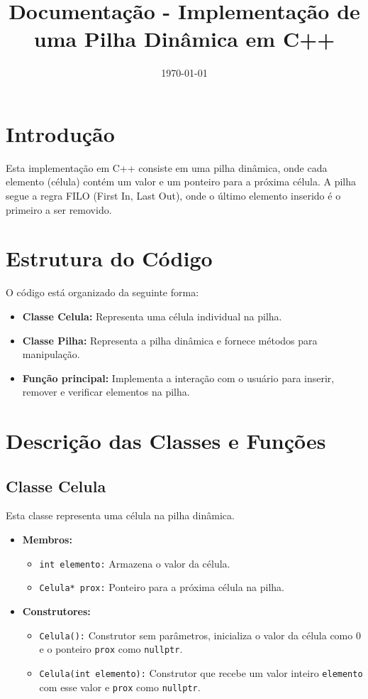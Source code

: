 \documentclass[a4paper,12pt]{article}
\title{Documentação - Implementação de uma Pilha Dinâmica em C++}
\date{\today}
\begin{document}
\maketitle

\section{Introdução}
Esta implementação em C++ consiste em uma pilha dinâmica, onde cada elemento (célula) contém um valor e um ponteiro para a próxima célula. A pilha segue a regra FILO (First In, Last Out), onde o último elemento inserido é o primeiro a ser removido.

\section{Estrutura do Código}
O código está organizado da seguinte forma:
\begin{itemize}
    \item \textbf{Classe Celula:} Representa uma célula individual na pilha.
    \item \textbf{Classe Pilha:} Representa a pilha dinâmica e fornece métodos para manipulação.
    \item \textbf{Função principal:} Implementa a interação com o usuário para inserir, remover e verificar elementos na pilha.
\end{itemize}

\section{Descrição das Classes e Funções}

\subsection{Classe Celula}
Esta classe representa uma célula na pilha dinâmica.
\begin{itemize}
    \item \textbf{Membros:}
    \begin{itemize}
        \item \texttt{int elemento:} Armazena o valor da célula.
        \item \texttt{Celula* prox:} Ponteiro para a próxima célula na pilha.
    \end{itemize}
    \item \textbf{Construtores:}
    \begin{itemize}
        \item \texttt{Celula():} Construtor sem parâmetros, inicializa o valor da célula como 0 e o ponteiro \texttt{prox} como \texttt{nullptr}.
        \item \texttt{Celula(int elemento):} Construtor que recebe um valor inteiro  \texttt{elemento} com esse valor e \texttt{prox} como \texttt{nullptr}.
    \end{itemize}
\end{itemize}
\end{document}
